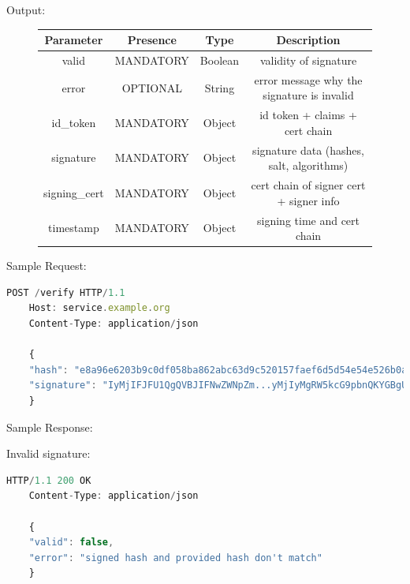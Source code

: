 Output:

\begin{figure}[H]
    \begin{center}
        \begin{tabular}{c|c|c|c}
            \textbf{Parameter} & \textbf{Presence} & \textbf{Type} & \textbf{Description} \\
            \hline
            valid & MANDATORY & Boolean & validity of signature \\
            \hline
            error & OPTIONAL & String & error message why the signature is invalid \\
            \hline
            id\_token & MANDATORY & Object & id token + claims + cert chain \\
            \hline
            signature & MANDATORY & Object & signature data (hashes, salt, algorithms) \\
            \hline
            signing\_cert & MANDATORY & Object & cert chain of signer cert + signer info \\
            \hline
            timestamp & MANDATORY & Object & signing time and cert chain \\
        \end{tabular}
    \end{center}
\end{figure}

Sample Request:
\begin{lstlisting}[caption={sign request}, captionpos=b, language=JavaScript, label={lst:verifyrequest}]
    POST /verify HTTP/1.1
    Host: service.example.org
    Content-Type: application/json

    {
    "hash": "e8a96e6203b9c0df058ba862abc63d9c520157faef6d5d54e54e526b0a85b2be",
    "signature": "IyMjIFJFU1QgQVBJIFNwZWNpZm...yMjIyMgRW5kcG9pbnQKYGBgUE9TVCAvYXBpL3YxL3NpZ25gYGAK"
    }
\end{lstlisting}

Sample Response:



Invalid signature:

\begin{lstlisting}[caption={sign response}, captionpos=b, language=JavaScript, label={lst:verifyresponsefailed}]
    HTTP/1.1 200 OK
    Content-Type: application/json

    {
    "valid": false,
    "error": "signed hash and provided hash don't match"
    }
\end{lstlisting}


